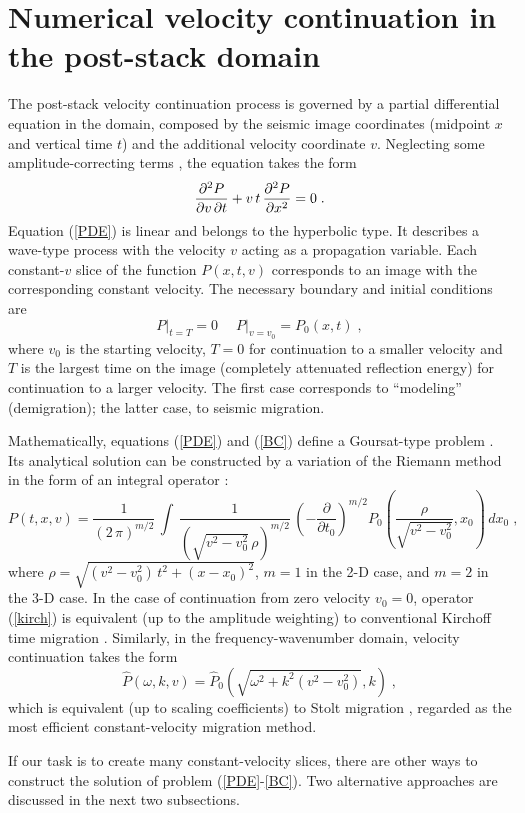 \section{Numerical velocity continuation in the post-stack domain}
\par
The post-stack velocity continuation process is governed by a partial
differential equation in the domain, composed by the seismic image
coordinates (midpoint $x$ and vertical time $t$) and the additional
velocity coordinate $v$. Neglecting some amplitude-correcting terms
\cite{first}, the equation takes the form
\cite{Claerbout.sep.48.79}
\begin{equation}
  \label{PDE}
  {{\partial^2 P} \over {\partial v\, \partial t}} +
  v\,t\,{{\partial^2 P} \over {\partial x^2}} = 0\;.
\end{equation}
Equation (\ref{PDE}) is linear and belongs to the hyperbolic type. It
describes a wave-type process with the velocity $v$ acting as a
propagation variable. Each constant-$v$ slice of the function
$P(x,t,v)$ corresponds to an image with the corresponding constant
velocity. The necessary boundary and initial conditions are 
\begin{equation}
  \label{BC}
  \left.P\right|_{t=T} = 0\;\quad \left.P\right|_{v=v_0} = P_0 (x,t)\;,
\end{equation}
where $v_0$ is the starting velocity, $T=0$ for continuation to a smaller
velocity and $T$ is the largest time on the image (completely attenuated
reflection energy) for continuation to a larger velocity.  The first case
corresponds to ``modeling'' (demigration); the latter case, to seismic
migration.
\par
Mathematically, equations (\ref{PDE}) and (\ref{BC}) define a
Goursat-type problem \cite{kurant2}. Its analytical solution can be
constructed by a variation of the Riemann method in the form of an
integral operator \cite{me,first}:
\begin{equation}
  \label{kirch}
  P(t,x,v) = \frac{1}{(2\,\pi)^{m/2}}\,\int\, 
  \frac{1}{(\sqrt{v^2-v_0^2}\,\rho)^{m/2}}\, 
  \left(- \frac{\partial}{\partial t_0}\right)^{m/2}
  P_0\left(\frac{\rho}{\sqrt{v^2-v_0^2}},x_0\right)\,dx_0\;,
\end{equation}
where $\rho = \sqrt{(v^2-v_0^2)\,t^2 + (x - x_0)^2}$, $m=1$ in the 2-D
case, and $m=2$ in the 3-D case. In the case of continuation from zero
velocity $v_0=0$, operator (\ref{kirch}) is equivalent (up to the
amplitude weighting) to conventional Kirchoff time migration
\cite{GEO43.01.00490076}.  Similarly, in the frequency-wavenumber
domain, velocity continuation takes the form
\begin{equation}
  \label{stolt}
  \hat{P} (\omega,k,v) = \hat{P}_0 (\sqrt{\omega^2+k^2 (v^2-v_0^2)},k)\;,
\end{equation}
which is equivalent (up to scaling coefficients) to Stolt migration
\cite{GEO43.01.00230048}, regarded as the most efficient constant-velocity
migration method.
\par
If our task is to create many constant-velocity slices, there are
other ways to construct the solution of problem (\ref{PDE}-\ref{BC}).
Two alternative approaches are discussed in the next two
subsections.
